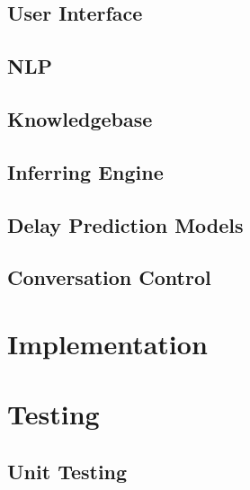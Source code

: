 \documentclass[11pt]{article}
\begin{document}
\subsection{User Interface} 

\subsection{NLP}

\subsection{Knowledgebase}

\subsection{Inferring Engine}

\subsection{Delay Prediction Models}

\subsection{Conversation Control}

%

\section{Implementation}

\section{Testing}

\subsection{Unit Testing}
\end{document}

